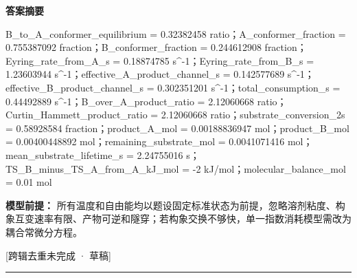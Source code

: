 \documentclass[UTF8,11pt,a4paper]{ctexart}
\begin{document}
\noindent\textbf{答案摘要}\par
B\_to\_A\_conformer\_equilibrium = 0.32382458 ratio；A\_conformer\_fraction = 0.755387092 fraction；B\_conformer\_fraction = 0.244612908 fraction；Eyring\_rate\_from\_A\_s = 0.18874785 s\textasciicircum{}-1；Eyring\_rate\_from\_B\_s = 1.23603944 s\textasciicircum{}-1；effective\_A\_product\_channel\_s = 0.142577689 s\textasciicircum{}-1；effective\_B\_product\_channel\_s = 0.302351201 s\textasciicircum{}-1；total\_consumption\_s = 0.44492889 s\textasciicircum{}-1；B\_over\_A\_product\_ratio = 2.12060668 ratio；Curtin\_Hammett\_product\_ratio = 2.12060668 ratio；substrate\_conversion\_2s = 0.58928584 fraction；product\_A\_mol = 0.00188836947 mol；product\_B\_mol = 0.00400448892 mol；remaining\_substrate\_mol = 0.0041071416 mol；mean\_substrate\_lifetime\_s = 2.24755016 s；TS\_B\_minus\_TS\_A\_from\_A\_kJ\_mol = -2 kJ/mol；molecular\_balance\_mol = 0.01 mol\par
\noindent\textbf{模型前提：}
所有温度和自由能均以题设固定标准状态为前提，忽略溶剂粘度、构象互变速率有限、产物可逆和隧穿；若构象交换不够快，单一指数消耗模型需改为耦合常微分方程。\par
\noindent\textcolor{red!65!black}{[跨辑去重未完成 · 草稿]} \par
\medskip\hrule\medskip
{}
\end{document}
